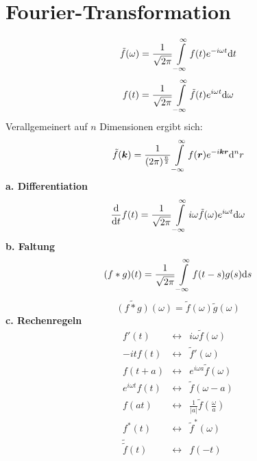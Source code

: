 \section{Fourier-Transformation}
\begin{equation*}
\tilde{f}(\omega)=\frac{1}{\sqrt{2\pi}}\int\limits_{-\infty}^{\infty} f(t)e^{-i\omega t} \mathrm{d} t
\end{equation*}
\begin{equation*}
f(t)=\frac{1}{\sqrt{2\pi}}\int\limits_{-\infty}^{\infty} \tilde{f}(t)e^{i\omega t} \mathrm{d} \omega
\end{equation*}
Verallgemeinert auf $n$ Dimensionen ergibt sich:\\
\begin{equation*}
\tilde{f}(\bm{k})=\frac{1}{({2\pi})^{\frac{n}{2}}}\int\limits_{-\infty}^{\infty} f(\bm{r})e^{-i\bm{k}\bm{r}} \mathrm{d} ^nr
\end{equation*}
\linebreak
\textbf{a. Differentiation}\\
\begin{equation*}
\frac{\mathrm{d}{}}{\mathrm{d}{t}}f(t)=\frac{1}{\sqrt{2\pi}}\int\limits_{-\infty}^{\infty} i\omega\tilde{f}(\omega)e^{i\omega t} \mathrm{d} \omega
\end{equation*}
\linebreak
\textbf{b. Faltung}\\
\begin{equation*}
(f*g)(t)=\frac{1}{\sqrt{2\pi}}\int\limits_{-\infty}^{\infty} f(t-s)g(s) \mathrm{d} s
\end{equation*}
\begin{equation*}
\widetilde{(f*g)}(\omega)=\tilde{f}(\omega)\tilde{g}(\omega)
\end{equation*}
\textbf{c. Rechenregeln}\\
\begin{eqnarray*}
f'(t) & \leftrightarrow & i\omega\tilde{f}(\omega)\\
-itf(t) & \leftrightarrow &\tilde{f}'(\omega)\\
f(t+a) & \leftrightarrow & e^{i\omega a}\tilde{f}(\omega)\\
e^{i\omega t}f(t) & \leftrightarrow & \tilde{f}(\omega-a)\\
f(at) & \leftrightarrow & \frac{1}{|a|}\tilde{f}\left(\frac{\omega}{a}\right)\\
f^*(t) & \leftrightarrow & \tilde{f}^*(\omega)\\
\tilde{\tilde{f}}(t) & \leftrightarrow & f(-t)\\
\end{eqnarray*}

